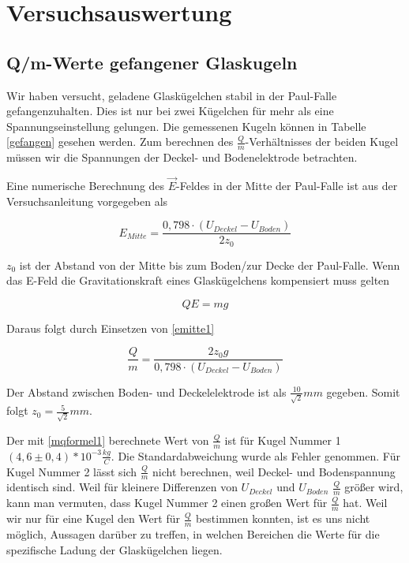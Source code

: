 \documentclass[10pt,a4paper]{article}
\begin{document}
\section{Versuchsauswertung}

\subsection{Q/m-Werte gefangener Glaskugeln}

Wir haben versucht, geladene Glaskügelchen stabil in der Paul-Falle gefangenzuhalten. Dies ist nur bei zwei Kügelchen für mehr als eine Spannungseinstellung gelungen. Die gemessenen Kugeln können in Tabelle \ref{gefangen} gesehen werden. Zum berechnen des $\frac{Q}{m}$-Verhältnisses der beiden Kugel müssen wir die Spannungen der Deckel- und Bodenelektrode betrachten.

Eine numerische Berechnung des $\vec{E}$-Feldes in der Mitte der Paul-Falle ist aus der Versuchsanleitung vorgegeben als 

\begin{equation}
	E_{Mitte} = \frac{0,798 \cdot (U_{Deckel} - U_{Boden})}{2 z_0}
	\label{emitte1}
\end{equation}

$z_0$ ist der Abstand von der Mitte bis zum Boden/zur Decke der Paul-Falle. Wenn das E-Feld die Gravitationskraft eines Glaskügelchens kompensiert muss gelten

\begin{equation}
	Q E = m g
\end{equation}

Daraus folgt durch Einsetzen von \eqref{emitte1}

\begin{equation}
	\frac{Q}{m} = \frac{2 z_0 g}{0,798 \cdot(U_{Deckel} - U_{Boden})}
	\label{mqformel1}
\end{equation}

 Der Abstand zwischen Boden- und Deckelelektrode ist als $\frac{10}{\sqrt{2}}mm$ gegeben. Somit folgt $z_0 = \frac{5}{\sqrt{2}}mm$.
 
 Der mit \eqref{mqformel1} berechnete Wert von $\frac{Q}{m}$ ist für Kugel Nummer 1 $(4,6 \pm 0,4)*10^{-3} \frac{kg}{C}$. Die Standardabweichung wurde als Fehler genommen. Für Kugel Nummer 2 lässt sich $\frac{Q}{m}$ nicht berechnen, weil Deckel- und Bodenspannung identisch sind. Weil für kleinere Differenzen von $U_{Deckel}$ und $U_{Boden}$ $\frac{Q}{m}$ größer wird, kann man vermuten, dass Kugel Nummer 2 einen großen Wert für $\frac{Q}{m}$ hat. Weil wir nur für eine Kugel den Wert für $\frac{Q}{m}$ bestimmen konnten, ist es uns nicht möglich, Aussagen darüber zu treffen, in welchen Bereichen die Werte für die spezifische Ladung der Glaskügelchen liegen.
\end{document}

